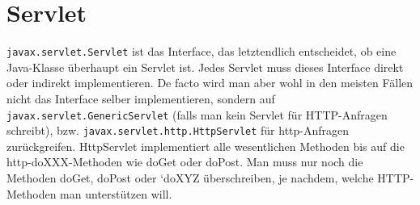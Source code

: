 \section{Servlet}

\texttt{javax.servlet.Servlet} ist das Interface, das letztendlich entscheidet, ob eine Java-Klasse überhaupt ein Servlet ist. Jedes Servlet muss dieses Interface direkt oder indirekt implementieren. De facto wird man aber wohl in den meisten Fällen nicht das Interface selber implementieren, sondern auf \texttt{javax.servlet.GenericServlet} (falls man kein Servlet für HTTP-Anfragen schreibt), bzw. \texttt{javax.servlet.http.HttpServlet} für http-Anfragen zurückgreifen. HttpServlet implementiert alle wesentlichen Methoden bis auf die http-doXXX-Methoden wie doGet oder doPost. Man muss nur noch die Methoden doGet, doPost oder `doXYZ überschreiben, je nachdem, welche HTTP-Methoden man unterstützen will.

